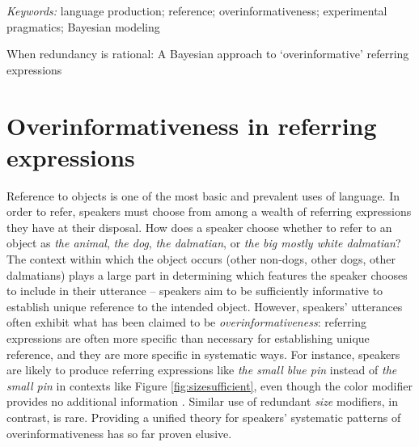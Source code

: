 \documentclass[11pt]{article}
\newcommand{\jd}[1]{\textcolor{Red}{[jd: #1]}}
\newcommand{\ndg}[1]{\textcolor{Green}{[ndg: #1]}}
\newcommand{\figref}[1]{Figure \ref{#1}}
\begin{document}
\emph{Keywords:} language production; reference; overinformativeness; experimental pragmatics; Bayesian modeling


\pagebreak




When redundancy is rational: A Bayesian approach to `overinformative' referring expressions


\section[]{Overinformativeness in referring expressions}
\label{sec:intro}

Reference to objects is one of the most basic and prevalent uses of language. In order to refer, speakers must choose from among a wealth of referring expressions they have at their disposal. How does a speaker choose whether to refer to an object as \emph{the animal}, \emph{the dog}, \emph{the dalmatian}, or \emph{the big mostly white dalmatian}? The context within which the object occurs (other non-dogs, other dogs, other dalmatians) plays a large part in determining which features the speaker chooses to include in their utterance -- speakers aim to be sufficiently informative to establish unique reference to the intended object. However, speakers' utterances often exhibit what has been claimed to be \emph{overinformativeness}: referring expressions are often more specific than necessary for establishing unique reference, and they are more specific in systematic ways. For instance, speakers are likely to produce referring expressions like \emph{the small blue pin} instead of  \emph{the small pin} in contexts like \figref{fig:sizesufficient}, even though the color modifier provides no additional information \cite{gatt2011, Gatt2014, Arts2011, Koolen2011}. Similar use of redundant \emph{size} modifiers, in contrast, is rare. %
Providing a unified theory for speakers' systematic patterns of overinformativeness has so far proven elusive.
\end{document}
